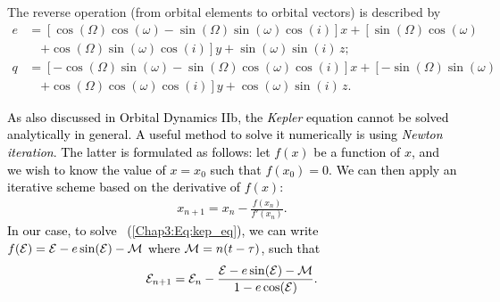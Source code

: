 \documentclass[main.tex]{subfiles}
\begin{document}
\begin{tcolorbox}[sharp corners, colback=green!30, colframe=green!80!blue, title=Box \refstepcounter{educhap3}\label{boxchap3:dynIV}\ref{boxchap3:dynIV} -- Orbital Dynamics IV]
{%
The reverse operation (from orbital elements to orbital vectors) is described by
\begin{subequations}
\label{Chap3:Eq:elements_to_vec}
\begin{align}
\nonumber \unit{e} &= \left [ \cos(\Omega) \cos(\omega) - \sin(\Omega) \sin(\omega) \cos(i) \right ] \unit{x} + \left [ \sin(\Omega) \cos(\omega) \right. \\
&\quad \left. + \cos(\Omega) \sin(\omega) \cos(i) \right ] \unit{y} + \sin(\omega) \sin(i) \, \unit{z}; \\
\nonumber \unit{q} &= \left [ -\cos(\Omega) \sin(\omega) - \sin(\Omega) \cos(\omega) \cos(i) \right ] \unit{x} + \left [ -\sin(\Omega) \sin(\omega) \right. \\
&\quad \left. + \cos(\Omega) \cos(\omega) \cos(i) \right ] \unit{y} + \cos(\omega) \sin(i) \, \unit{z}.
\end{align}
\end{subequations}
}
\end{tcolorbox}

\begin{tcolorbox}[sharp corners, colback=green!30, colframe=green!80!blue, title=Box \ref{boxchap3:dynIV} -- Orbital Dynamics IV (continued)]
\par \textcolor{black}{As also discussed in Orbital Dynamics IIb, the {\it Kepler} equation cannot be solved analytically in general. A useful method to solve it numerically is using {\it Newton iteration}. The latter is formulated as follows: let $f(x)$ be a function of $x$, and we wish to know the value of $x=x_0$ such that $f(x_0)=0$. We can then apply an iterative scheme based on the derivative of $f(x)$: 
\begin{align}
x_{n+1} = x_n - \frac{f(x_n)}{f'(x_n)}.
\end{align}
In our case, to solve \Eq~(\ref{Chap3:Eq:kep_eq}), we can write $f(\mathcal{E}) = \mathcal{E} - e \sin(\mathcal{E}) - \mathcal{M}$ where $\mathcal{M} = n(t-\tau)$, such that
\begin{align}
\mathcal{E}_{n+1} = \mathcal{E}_n - \frac{\mathcal{E} - e \sin(\mathcal{E}) - \mathcal{M}}{1 - e \cos(\mathcal{E})}.
\end{align}
}
\end{tcolorbox}
\end{document}
